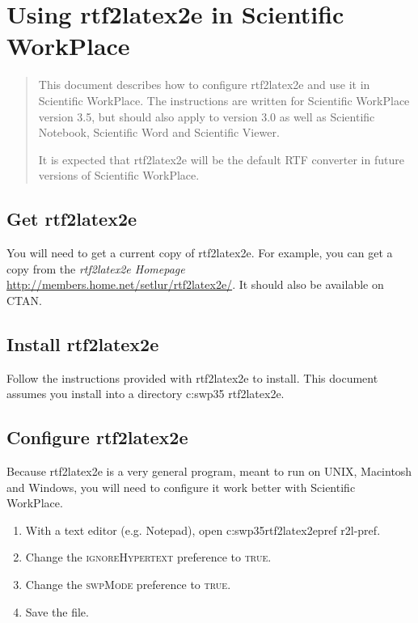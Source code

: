 \documentclass{article}
\begin{document}
\section{Using rtf2latex2e in Scientific WorkPlace}

\begin{quotation}
This document describes how to configure rtf2latex2e and use it in
Scientific WorkPlace. The instructions are written for Scientific WorkPlace
version 3.5, but should also apply to version 3.0 as well as Scientific
Notebook, Scientific Word and Scientific Viewer.

It is expected that rtf2latex2e will be the default RTF converter in future
versions of Scientific WorkPlace.
\end{quotation}

\subsection{Get rtf2latex2e}

You will need to get a current copy of rtf2latex2e. For example, you can get
a copy from the \textit{rtf2latex2e Homepage} \hyperref{%
http://members.home.net/setlur/rtf2latex2e/}{}{}{%
http://members.home.net/setlur/rtf2latex2e/}. It should also be available on
CTAN.

\subsection{Install rtf2latex2e}

Follow the instructions provided with rtf2latex2e to install. This document
assumes you install into a directory \textsf{c:\TEXTsymbol{\backslash}swp35%
\TEXTsymbol{\backslash}rtf2latex2e}.

\subsection{Configure rtf2latex2e}

Because rtf2latex2e is a very general program, meant to run on UNIX,
Macintosh and Windows, you will need to configure it work better with
Scientific WorkPlace.

\begin{enumerate}
\item With a text editor (e.g. Notepad), open \textsf{c:\TEXTsymbol{%
\backslash}swp35\TEXTsymbol{\backslash}rtf2latex2e\TEXTsymbol{\backslash}pref%
\TEXTsymbol{\backslash}r2l-pref}.

\item Change the \textsc{ignoreHypertext} preference to \textsc{true}.

\item Change the \textsc{swpMode} preference to \textsc{true}.

\item Save the file.
\end{enumerate}
\end{document}
